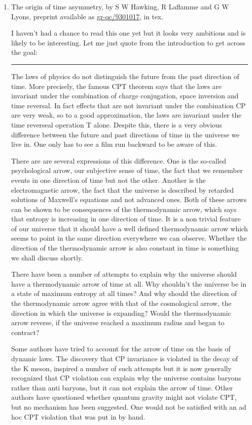 \begin{enumerate}
\item The origin of time asymmetry, by S W Hawking, R Laflamme and G W Lyons, preprint available as \href{https://arxiv.org/abs/gr-qc/9301017}{gr-qc/9301017}, in tex.

I haven't had a chance to read this one yet but it looks very ambitious and is likely to be interesting. Let me just quote from the introduction to get across the goal:
\bigskip
\hrule
\bigskip
The laws of physics do not distinguish the future from the past direction of time. More precisely, the famous CPT theorem says that the laws are invariant under the combination of charge conjugation, space inversion and time reversal. In fact effects that are not invariant under the combination CP are very weak, so to a good approximation, the laws are invariant under the time reverseal operation T alone. Despite this, there is a very obvious difference between the future and past directions of time in the universe we live in. One only has to see a film run backward to be aware of this.

There are are several expressions of this difference. One is the so-called psychological arrow, our subjective sense of time, the fact that we remember events in one direction of time but not the other. Another is the electromagnetic arrow, the fact that the universe is described by retarded solutions of Maxwell's equations and not advanced ones. Both of these arrows can be shown to be consequences of the thermodynamic arrow, which says that entropy is increasing in one direction of time. It is a non trivial feature of our universe that it should have a well defined thermodynamic arrow which seems to point in the same direction everywhere we can observe. Whether the direction of the thermodynamic arrow is also constant in time is something we shall discuss shortly.

There have been a number of attempts to explain why the universe should have a thermodynamic arrow of time at all. Why shouldn't the universe be in a state of maximum entropy at all times? And why should the direction of the thermodynamic arrow agree with that of the cosmological arrow, the direction in which the universe is expanding? Would the thermodynamic arrow reverse, if the universe reached a maximum radius and began to contract?

Some authors have tried to account for the arrow of time on the basis of dynamic laws. The discovery that CP invariance is violated in the decay of the K meson, inspired a number of such attempts but it is now generally recognized that CP violation can explain why the universe contains baryons rather than anti baryons, but it can not explain the arrow of time. Other authors have questioned whether quantum gravity might not violate CPT, but no mechanism has been suggested. One would not be satisfied with an ad hoc CPT violation that was put in by hand.


\end{enumerate}
